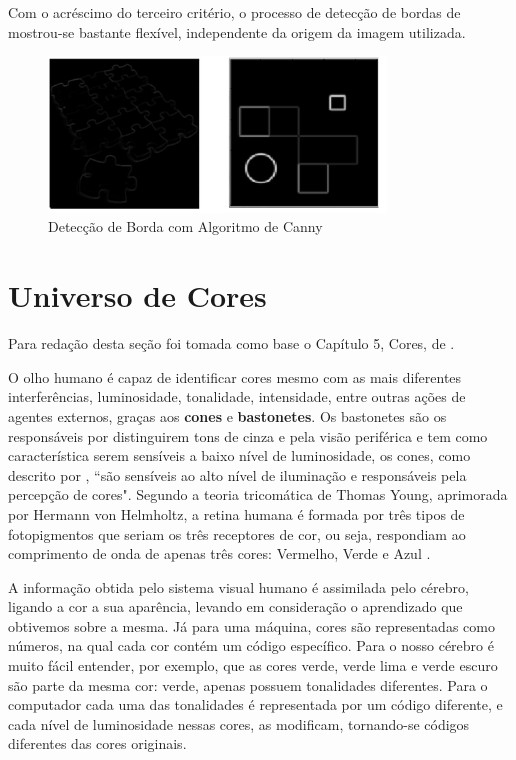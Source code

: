 Com o acréscimo do terceiro critério, o processo de detecção de bordas de 
mostrou-se bastante flexível, independente da origem da imagem utilizada\cite{Vale:2002}.

 \begin{figure}[H]
	\centering
	\includegraphics[width=0.8\textwidth]{canny.pdf}
	\caption{Detecção de Borda com Algoritmo de Canny\cite{Saini:2013} }
	\label{Canny}
\end{figure}







\section{Universo de Cores} \label{Sec:Cores}

Para redação desta seção foi tomada como base o Capítulo 5, Cores, de .

O olho humano é capaz de identificar cores mesmo com as mais diferentes interferências, luminosidade, tonalidade, intensidade, entre outras ações de agentes externos, graças aos \textbf{cones} e \textbf{bastonetes}. Os bastonetes são os responsáveis por distinguirem tons de cinza e pela visão periférica e tem como característica serem sensíveis a baixo nível de luminosidade, os cones, como descrito por , ``são sensíveis ao alto nível de iluminação e responsáveis pela percepção de cores". Segundo a teoria tricomática de Thomas Young, aprimorada por Hermann von Helmholtz, a retina humana é formada por três tipos de fotopigmentos que seriam os três receptores de cor, ou seja, respondiam ao comprimento de onda de apenas três cores: Vermelho, Verde e Azul \cite{Azevedo:2003}. 

A informação obtida pelo sistema visual humano é assimilada pelo cérebro, ligando a cor a sua aparência, levando em consideração o aprendizado que obtivemos sobre a mesma. Já para uma máquina, cores são representadas como números, na qual cada cor contém um código específico. Para o nosso cérebro é muito fácil entender, por exemplo, que as cores verde, verde lima e verde escuro são parte da mesma cor: verde, apenas possuem tonalidades diferentes. Para o computador cada uma das tonalidades é representada por um código diferente, e cada nível de luminosidade nessas cores, as modificam, tornando-se códigos diferentes das cores originais.



